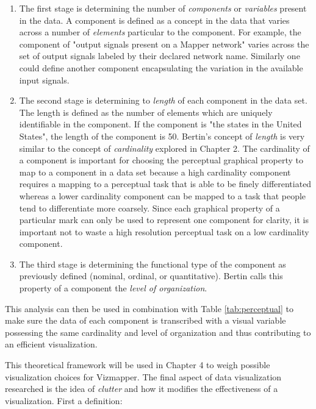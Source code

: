 \begin{enumerate}
\item The first stage is determining the number of \emph{components} or \emph{variables} present in the data. A component is defined as a concept in the data that varies across a number of \emph{elements} particular to the component. For example, the component of "output signals present on a Mapper network" varies across the set of output signals labeled by their declared network name. Similarly one could define another component encapsulating the variation in the available input signals. 

\item The second stage is determining to \emph{length} of each component in the data set. The length is defined as the number of elements which are uniquely identifiable in the component. If the component is "the states in the United States", the length of the component is 50. Bertin's concept of \emph{length} is very similar to the concept of \emph{cardinality} explored in Chapter 2. The cardinality of a component is important for choosing the perceptual graphical property to map to a component in a data set because a high cardinality component requires a mapping to a perceptual task that is able to be finely differentiated whereas a lower cardinality component can be mapped to a task that people tend to differentiate more coarsely. Since each graphical property of a particular mark can only be used to represent one component for clarity, it is important not to waste a high resolution perceptual task on a low cardinality component.

\item The third stage is determining the functional type of the component as previously defined (nominal, ordinal, or quantitative). Bertin calls this property of a component the \emph{level of organization}.
\end{enumerate}

This analysis can then be used in combination with Table \ref{tab:perceptual} to make sure the data of each component is transcribed with a visual variable possessing the same cardinality and level of organization and thus contributing to an efficient visualization.

This theoretical framework will be used in Chapter 4 to weigh possible visualization choices for Vizmapper. The final aspect of data visualization researched is the idea of \emph{clutter} and how it modifies the effectiveness of a visualization. First a definition:

